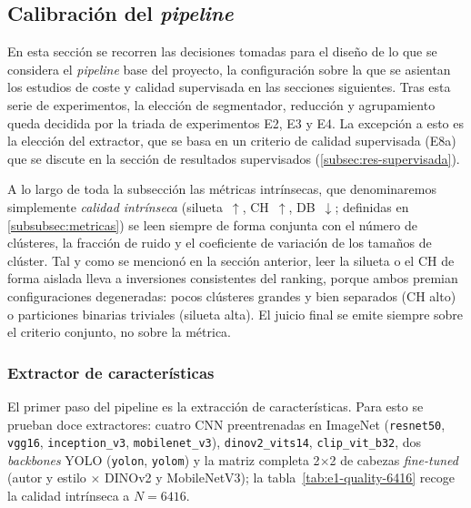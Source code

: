 \subsection{Calibración del \textit{pipeline}}
\label{subsec:res-calibracion}
En esta sección se recorren las decisiones tomadas para el diseño de lo que se
considera el \textit{pipeline} base del proyecto, la configuración sobre la que
se asientan los estudios de coste y calidad supervisada en las secciones
siguientes. Tras esta serie de experimentos, la elección de segmentador,
reducción y agrupamiento queda decidida por la triada de experimentos E2, E3 y
E4. La excepción a esto es la elección del extractor, que se basa en un
criterio de calidad supervisada (E8a) que se discute en la sección de
resultados supervisados (\ref{subsec:res-supervisada}).

A lo largo de toda la subsección las métricas intrínsecas, que denominaremos
simplemente \textit{calidad intrínseca} (silueta~$\uparrow$, CH~$\uparrow$,
DB~$\downarrow$; definidas en \ref{subsubsec:metricas}) se leen siempre de
forma conjunta con el número de clústeres, la fracción de ruido y el
coeficiente de variación de los tamaños de clúster. Tal y como se mencionó en
la sección anterior, leer la silueta o el CH de forma aislada lleva a
inversiones consistentes del ranking, porque ambos premian configuraciones
degeneradas: pocos clústeres grandes y bien separados (CH alto) o particiones
binarias triviales (silueta alta). El juicio final se emite siempre sobre el
criterio conjunto, no sobre la métrica.

\subsubsection{Extractor de características}
\label{subsubsec:res-extractor}
El primer paso del pipeline es la extracción de características. Para esto se
prueban doce extractores: cuatro CNN preentrenadas en ImageNet
(\texttt{resnet50}, \texttt{vgg16}, \texttt{inception\_v3},
\texttt{mobilenet\_v3}), \texttt{dinov2\_vits14}, \texttt{clip\_vit\_b32}, dos
\textit{backbones} YOLO (\texttt{yolon}, \texttt{yolom}) y la matriz completa
2$\times$2 de cabezas \textit{fine-tuned} (autor y estilo $\times$ DINOv2 y
MobileNetV3); la tabla~\ref{tab:e1-quality-6416} recoge la calidad intrínseca a
$N=6416$.

